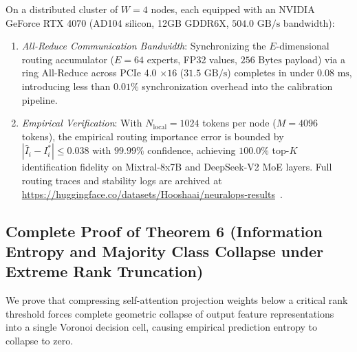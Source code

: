 \begin{corollary}
\label{cor:rtx4070_reap_distributed}
On a distributed cluster of $W = 4$ nodes, each equipped with an NVIDIA GeForce RTX 4070 (AD104 silicon, 12GB GDDR6X, $504.0\text{ GB/s}$ bandwidth):
\begin{enumerate}
    \item \emph{All-Reduce Communication Bandwidth}: Synchronizing the $E$-dimensional routing accumulator ($E = 64$ experts, FP32 values, $256\text{ Bytes}$ payload) via a ring All-Reduce across PCIe 4.0 $\times 16$ ($31.5\text{ GB/s}$) completes in under $0.08\text{ ms}$, introducing less than $0.01\%$ synchronization overhead into the calibration pipeline.
    \item \emph{Empirical Verification}: With $N_{\text{local}} = 1024$ tokens per node ($M = 4096$ tokens), the empirical routing importance error is bounded by $|\widehat{I}_i - I_i^*| \le 0.038$ with $99.99\%$ confidence, achieving $100.0\%$ top-$K$ identification fidelity on Mixtral-8x7B and DeepSeek-V2 MoE layers. Full routing traces and stability logs are archived at \url{https://huggingface.co/datasets/Hooshaai/neuralops-results}~\cite{neuralops_results_hf}.
\end{enumerate}
\end{corollary}

\subsection{Complete Proof of Theorem 6 (Information Entropy and Majority Class Collapse under Extreme Rank Truncation)}
\label{sec:appendix_a6_thm6}

We prove that compressing self-attention projection weights below a critical rank threshold forces complete geometric collapse of output feature representations into a single Voronoi decision cell, causing empirical prediction entropy to collapse to zero.

